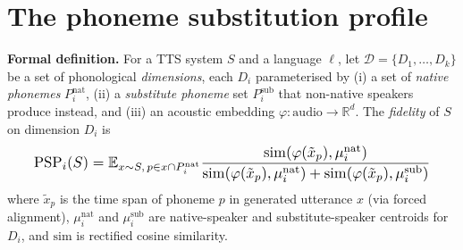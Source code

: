 \documentclass[conference,a4paper]{IEEEtran}
\begin{document}
\section{The phoneme substitution profile}
\label{sec:method}

\textbf{Formal definition.} For a TTS system $S$ and a language $\ell$, let $\mathcal{D} = \{D_1, \dots, D_k\}$ be a set of phonological \emph{dimensions}, each $D_i$ parameterised by (i) a set of \emph{native phonemes} $P_i^{\text{nat}}$, (ii) a \emph{substitute phoneme} set $P_i^{\text{sub}}$ that non-native speakers produce instead, and (iii) an acoustic embedding $\varphi: \text{audio} \to \mathbb{R}^d$. The \emph{fidelity} of $S$ on dimension $D_i$ is
\begin{equation}
\resizebox{0.92\columnwidth}{!}{$
\displaystyle
\text{PSP}_i(S) = \mathbb{E}_{x \sim S,\, p \in x \cap P_i^{\text{nat}}}
  \frac{\mathrm{sim}(\varphi(\tilde{x}_p), \mu_i^{\text{nat}})}
       {\mathrm{sim}(\varphi(\tilde{x}_p), \mu_i^{\text{nat}}) + \mathrm{sim}(\varphi(\tilde{x}_p), \mu_i^{\text{sub}})}
$}
\end{equation}
where $\tilde{x}_p$ is the time span of phoneme $p$ in generated utterance $x$ (via forced alignment), $\mu_i^{\text{nat}}$ and $\mu_i^{\text{sub}}$ are native-speaker and substitute-speaker centroids for $D_i$, and $\mathrm{sim}$ is rectified cosine similarity.
\end{document}
